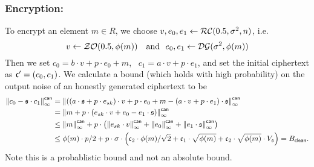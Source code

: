 \subsubsection{Encryption:}
To encrypt an element $m\in R$, we choose $v, e_0, e_1 \leftarrow \mathcal{RC}(0.5,\sigma^2,n)$, i.e.
\[
  v \leftarrow \mathcal{ZO}(0.5, \phi(m)) ~~~\mbox{and}~~ e_0,e_1 \leftarrow \mathcal{DG}(\sigma^2,\phi(m))
\]
Then we set $c_0 = b \cdot v + p \cdot e_0+m$,~ $c_1=a\cdot v+p\cdot
  e_1$, and set the initial ciphertext as $\mathfrak{c}'=(c_0,c_1)$.
We calculate a bound (which holds with high probability) on the output noise of
an honestly generated ciphertext to be
\begin{align*}
  {\Vert c_0 - \mathfrak{s}\cdot c_1 \Vert}_\infty^{\mathsf{can}}
   & = {\Vert ((a \cdot \mathfrak{s}+ p \cdot e_{sk}) \cdot v +p \cdot e_0 +m
    - (a \cdot v+ p \cdot e_1) \cdot \mathfrak{s}  \Vert}_\infty^{\mathsf{can}}                      \\
   & = {\Vert m + p \cdot (e_{sk} \cdot v +e_0 - e_1 \cdot \mathfrak{s}) \Vert}_\infty^{\mathsf{can}} \\
   & \le {\Vert m \Vert}_\infty^{\mathsf{can}}
  +p \cdot \left( {\Vert e_{sk} \cdot v \Vert}_\infty^{\mathsf{can}}
  + {\Vert e_0 \Vert}_\infty^{\mathsf{can}}
  + {\Vert e_1 \cdot \mathfrak{s} \Vert}_\infty^{\mathsf{can}}
  \right)                                                                   \\
   & \le \phi(m) \cdot p/2
  + p \cdot \sigma \cdot
  \left( \mathfrak{c}_2 \cdot \phi(m) / \sqrt{2}
  + \mathfrak{c}_1 \cdot \sqrt{\phi(m)}
  + \mathfrak{c}_2 \cdot \sqrt{\phi(m)} \cdot V_{\mathfrak{s}}
  \right) = B_{\mathsf{clean}}.
\end{align*}
Note this is a probablistic bound and not an absolute bound.

\vspace{5mm}

